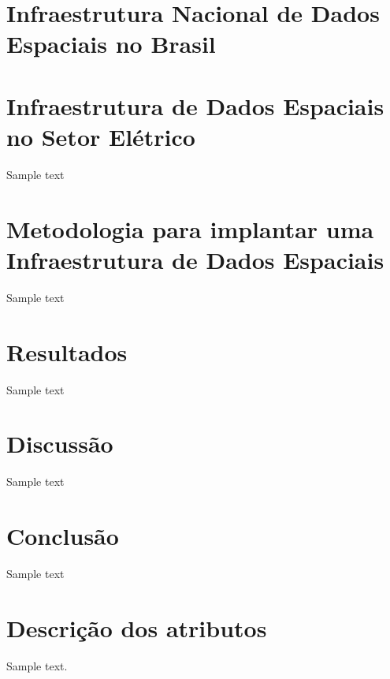 \documentclass[12pt,5p]{elsarticle}
\begin{document}


\section{Infraestrutura Nacional de Dados Espaciais no Brasil}

\citep{NeamahJebur2013ANSDI, Makanga2010AAfrica, Guptill1994SpatialPolicy}
\citep{eping, Borzacchiello2013EstimatingE-Cadastres, infoger}
\cite{infoger}

\section{Infraestrutura de Dados Espaciais no Setor El\'etrico}

Sample text

\section{Metodologia para implantar uma Infraestrutura de Dados Espaciais}

Sample text

\section{Resultados}

Sample text

\section{Discuss\~ao}

Sample text

\section{Conclus\~ao}

Sample text

\appendix

\section{Descri\c{c}\~ao dos atributos}
\label{appendix-sec1}

Sample text. 



%
% 
% 
% 
% 
% 
% 
% 
% 
% 
% 

% 


\end{document}
